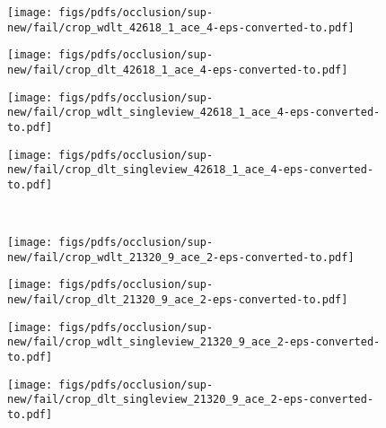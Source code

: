 \documentclass[runningheads]{llncs}
\begin{document}
\begin{figure*}
	\begin{subfigure}[b]{0.24\linewidth}        \centering
		\texttt{[image: figs/pdfs/occlusion/sup-new/fail/crop\_wdlt\_42618\_1\_ace\_4-eps-converted-to.pdf]}
	\end{subfigure}
	\begin{subfigure}[b]{0.24\linewidth}        \centering
		\texttt{[image: figs/pdfs/occlusion/sup-new/fail/crop\_dlt\_42618\_1\_ace\_4-eps-converted-to.pdf]}
	\end{subfigure}
	\begin{subfigure}[b]{0.24\linewidth}        \centering
		\texttt{[image: figs/pdfs/occlusion/sup-new/fail/crop\_wdlt\_singleview\_42618\_1\_ace\_4-eps-converted-to.pdf]}
	\end{subfigure}
	\begin{subfigure}[b]{0.24\linewidth}        \centering
		\texttt{[image: figs/pdfs/occlusion/sup-new/fail/crop\_dlt\_singleview\_42618\_1\_ace\_4-eps-converted-to.pdf]}
	\end{subfigure} \\ \vspace{1mm}

	
	\begin{subfigure}[b]{0.24\linewidth}        \centering
		\texttt{[image: figs/pdfs/occlusion/sup-new/fail/crop\_wdlt\_21320\_9\_ace\_2-eps-converted-to.pdf]}
\end{subfigure}
	\begin{subfigure}[b]{0.24\linewidth}        \centering
		\texttt{[image: figs/pdfs/occlusion/sup-new/fail/crop\_dlt\_21320\_9\_ace\_2-eps-converted-to.pdf]}
\end{subfigure}
	\begin{subfigure}[b]{0.24\linewidth}        \centering
		\texttt{[image: figs/pdfs/occlusion/sup-new/fail/crop\_wdlt\_singleview\_21320\_9\_ace\_2-eps-converted-to.pdf]}
\end{subfigure}
	\begin{subfigure}[b]{0.24\linewidth}        \centering
		\texttt{[image: figs/pdfs/occlusion/sup-new/fail/crop\_dlt\_singleview\_21320\_9\_ace\_2-eps-converted-to.pdf]}
\end{subfigure} \\  \vspace{-1mm}
	

\end{figure*}
\end{document}
